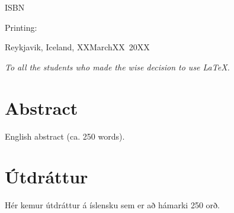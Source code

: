 \documentclass[a4paper,12pt,twoside,BCOR=10mm]{scrbook}
\def\thesisyear{20XX}       					%
\def\thesismonth{XXMarchXX}					%
\def\thesisISBN{}           					%
\def\thesisprinting{}						%
\begin{document}
\begin{titlepage}
  \ifx\thesisISBN\empty %
  \else
  ISBN~\thesisISBN
  \fi
  
  \ifx\thesisprinting\empty %
  \else
  Printing: \thesisprinting \\
  \fi


  Reykjavik, Iceland, \thesismonth~\thesisyear \\
  

  \newpage %

  \thispagestyle{empty} \mbox{}

  \vfill

  \begin{center}
    \textit{
      To all the students who made the wise decision to use \LaTeX. %
    }
  \end{center} \vspace*{5cm}

  \vfill 


\end{titlepage}

\cleardoublepage


\setcounter{page}{5}

\section*{Abstract}
English abstract (ca. 250 words).

\vfill \vspace*{1cm}

\section*{Útdráttur}
Hér kemur útdráttur á íslensku sem er að hámarki 250 orð.
\vfill
\end{document}
